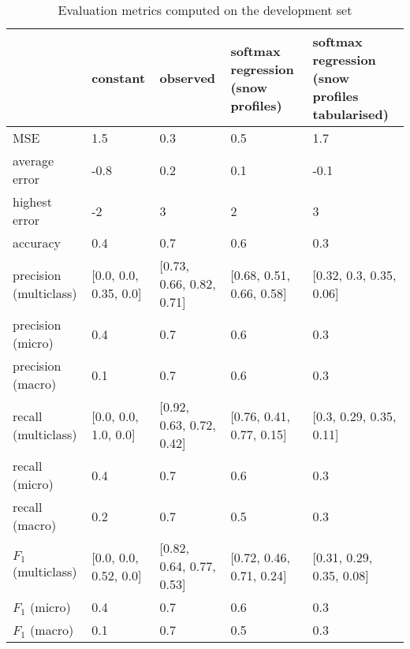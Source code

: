 \begin{table}[H]
\caption{Evaluation metrics computed on the development set}
\label{tbl:sais_eval_development}
\begin{tabular}{lllll}
\toprule
 & constant & observed & softmax regression (snow profiles) & softmax regression (snow profiles tabularised) \\
\midrule
MSE & 1.5 & 0.3 & 0.5 & 1.7 \\
average error & -0.8 & 0.2 & 0.1 & -0.1 \\
highest error & -2 & 3 & 2 & 3 \\
accuracy & 0.4 & 0.7 & 0.6 & 0.3 \\
precision (multiclass) & [0.0, 0.0, 0.35, 0.0] & [0.73, 0.66, 0.82, 0.71] & [0.68, 0.51, 0.66, 0.58] & [0.32, 0.3, 0.35, 0.06] \\
precision (micro) & 0.4 & 0.7 & 0.6 & 0.3 \\
precision (macro) & 0.1 & 0.7 & 0.6 & 0.3 \\
recall (multiclass) & [0.0, 0.0, 1.0, 0.0] & [0.92, 0.63, 0.72, 0.42] & [0.76, 0.41, 0.77, 0.15] & [0.3, 0.29, 0.35, 0.11] \\
recall (micro) & 0.4 & 0.7 & 0.6 & 0.3 \\
recall (macro) & 0.2 & 0.7 & 0.5 & 0.3 \\
$F_1$ (multiclass) & [0.0, 0.0, 0.52, 0.0] & [0.82, 0.64, 0.77, 0.53] & [0.72, 0.46, 0.71, 0.24] & [0.31, 0.29, 0.35, 0.08] \\
$F_1$ (micro) & 0.4 & 0.7 & 0.6 & 0.3 \\
$F_1$ (macro) & 0.1 & 0.7 & 0.5 & 0.3 \\
\bottomrule
\end{tabular}
\end{table}
